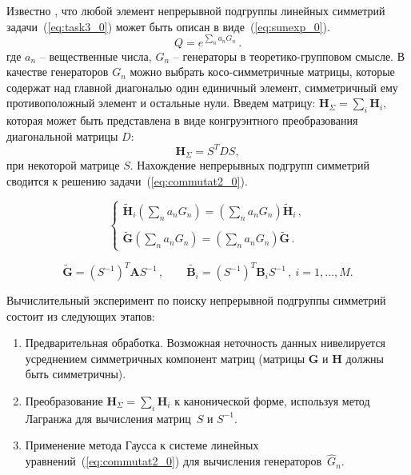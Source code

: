 Известно , что любой элемент непрерывной подгруппы линейных симметрий задачи~(\ref{eq:task3_0}) может быть описан в виде~(\ref{eq:sunexp_0}).
\begin{equation}
\label{eq:sunexp_0}
Q=e^{\sum\limits_n a_n G_n} \, .
\end{equation}
где $a_n$ -- вещественные числа, $G_n$ -- генераторы в теоретико-групповом смысле. В качестве генераторов $G_n$ можно выбрать косо-симметричные матрицы, которые содержат над главной диагональю один единичный элемент, симметричный ему противоположный элемент и остальные нули.
Введем матрицу: $ {\textbf{H}}_{\Sigma} = \sum_{i} \textbf{H}_i,$ которая может быть представлена в виде конгруэнтного преобразования диагональной матрицы $D$:
$${\textbf{H}}_{\Sigma} = S^TDS,$$
при некоторой матрице $S$.
Нахождение непрерывных подгрупп симметрий сводится к решению задачи~(\ref{eq:commutat2_0}).

\begin{equation}
\label{eq:commutat2_0}
\left\{
\begin{array}{l}
\displaystyle
\tilde{\textbf{H}}_i \left(\sum\limits_na_nG_n\right) =
\left(\sum\limits_na_nG_n\right)\tilde{\textbf{H}}_i \, , \\ \\
\displaystyle
\tilde{\textbf{G}} \left(\sum\limits_na_nG_n\right) = \left(\sum\limits_na_nG_n\right)\tilde{\textbf{G}} \, .
\end{array}
\right.
\end{equation}

\begin{equation}
\tilde{\textbf{G}}=\left(S^{-1}\right)^T \textbf{A} S^{-1} \, , \qquad
\tilde{\textbf{B}_i}=\left(S^{-1}\right)^T \textbf{B}_i S^{-1} \, , \ i=1,\dots,M.
\end{equation}

Вычислительный эксперимент по поиску непрерывной подгруппы симметрий состоит из следующих этапов:
\begin{enumerate}
  \item Предварительная обработка. Возможная неточность данных нивелируется усреднением симметричных компонент матриц (матрицы $\textbf{G}$ и $\textbf{H}$ должны быть симметричны).
  \item %
  Преобразование $ {\textbf{H}}_{\Sigma} = \sum_{i} \textbf{H}_i$ к канонической форме, используя метод Лагранжа для вычисления матриц~$S$ и $S^{-1} $.
  \item Применение метода Гаусса к системе линейных уравнений~(\ref{eq:commutat2_0}) для вычисления генераторов~$\hat{G}_n$.
\end{enumerate}

